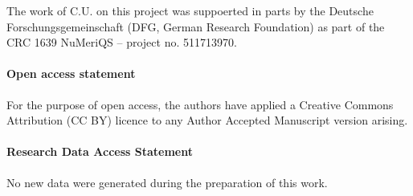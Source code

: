 \documentclass[a4paper,11pt]{article} \usepackage{pos} \usepackage{subcaption}
\begin{document}
The work of C.U. on this project was suppoerted in parts by the
Deutsche Forschungsgemeinschaft (DFG, German Research Foundation) as
part of the CRC 1639 NuMeriQS – project no. 511713970. 


\paragraph*{Open access statement}
For the purpose of open access, the authors have applied a Creative Commons
Attribution (CC BY) licence to any Author Accepted Manuscript version arising.

\paragraph*{Research Data Access Statement}
No new data were generated during the preparation of this work.



\end{document}
